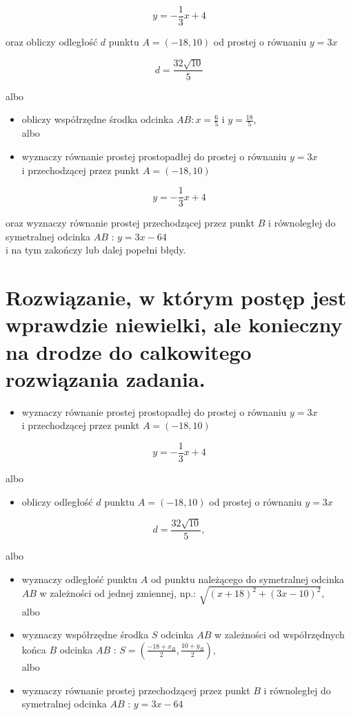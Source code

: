 \documentclass[10pt]{article}
\begin{document}
$$
y=-\frac{1}{3} x+4
$$

oraz obliczy odległość $d$ punktu $A=(-18,10)$ od prostej o równaniu $y=3 x$

$$
d=\frac{32 \sqrt{10}}{5}
$$

albo

\begin{itemize}
  \item obliczy współrzędne środka odcinka $A B: x=\frac{6}{5}$ i $y=\frac{18}{5}$,\\
albo
  \item wyznaczy równanie prostej prostopadłej do prostej o równaniu $y=3 x$\\
i przechodzącej przez punkt $A=(-18,10)$
\end{itemize}

$$
y=-\frac{1}{3} x+4
$$

oraz wyznaczy równanie prostej przechodzącej przez punkt $B$ i równoległej do symetralnej odcinka $A B$ : $y=3 x-64$\\
i na tym zakończy lub dalej popełni błędy.

\section*{Rozwiązanie, w którym postęp jest wprawdzie niewielki, ale konieczny na drodze do calkowitego rozwiązania zadania.}
\begin{itemize}
  \item wyznaczy równanie prostej prostopadłej do prostej o równaniu $y=3 x$\\
i przechodzącej przez punkt $A=(-18,10)$
\end{itemize}

$$
y=-\frac{1}{3} x+4
$$

albo

\begin{itemize}
  \item obliczy odległość $d$ punktu $A=(-18,10)$ od prostej o równaniu $y=3 x$
\end{itemize}

$$
d=\frac{32 \sqrt{10}}{5},
$$

albo

\begin{itemize}
  \item wyznaczy odległość punktu $A$ od punktu należącego do symetralnej odcinka $A B$ w zależności od jednej zmiennej, np.: $\sqrt{(x+18)^{2}+(3 x-10)^{2}}$,\\
albo
  \item wyznaczy współrzędne środka $S$ odcinka $A B$ w zależności od współrzędnych końca $B$ odcinka $A B$ : $S=\left(\frac{-18+x_{B}}{2}, \frac{10+y_{B}}{2}\right)$,\\
albo
  \item wyznaczy równanie prostej przechodzącej przez punkt $B$ i równoległej do symetralnej odcinka $A B$ : $y=3 x-64$
\end{itemize}
\end{document}

